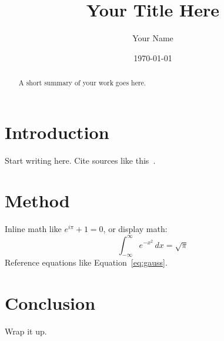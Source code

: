 \documentclass[11pt]{article}
\title{Your Title Here}
\author{Your Name}
\date{\today}
\begin{document}
\maketitle

\begin{abstract}
A short summary of your work goes here.
\end{abstract}

\section{Introduction}
Start writing here. Cite sources like this~\cite{knuth1984}.

\section{Method}
Inline math like $e^{i\pi} + 1 = 0$, or display math:
\begin{equation}
  \int_{-\infty}^{\infty} e^{-x^2}\,dx = \sqrt{\pi}
  \label{eq:gauss}
\end{equation}
Reference equations like Equation~\ref{eq:gauss}.

\section{Conclusion}
Wrap it up. 



\end{document}
